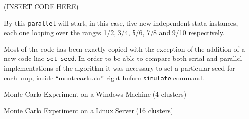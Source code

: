\documentclass[bib]{statapress}
\begin{document}
(INSERT CODE HERE)

By this {\tt parallel} will start, in this case, five new independent stata instances, each one looping over the ranges 1/2, 3/4, 5/6, 7/8 and 9/10 respectively.

Most of the code has been exactly copied with the exception of the addition of a new code line {\tt set seed}. In order to be able to compare both serial and parallel implementations of the algorithm it was necessary to set a particular seed for each loop, inside ``montecarlo.do'' right before {\tt simulate} command.

\begin{table}[!h]
\centering
\caption{Monte Carlo Experiment on a Windows Machine (4 clusters)}

\end{table}

\begin{table}[!h]
\centering
\caption{Monte Carlo Experiment on a Linux Server (16 clusters)}

\end{table}




\end{document}
